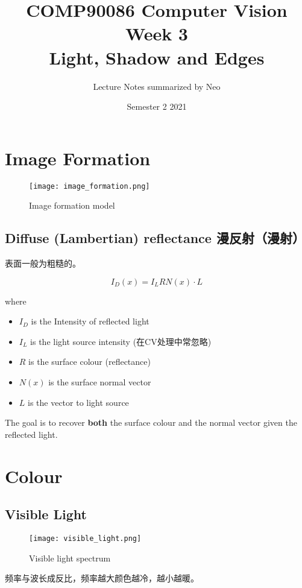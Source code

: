 \documentclass[11pt]{article}
\title{%
  \LARGE
  \textbf{COMP90086 Computer Vision \\
  \large Week 3
  \\
  Light, Shadow and Edges}}
\author{ Lecture Notes summarized by Neo }
\date{Semester 2 2021}
\begin{document}
\maketitle

\section{Image Formation}

\begin{figure}[hbt!]
    \centering
    \texttt{[image: image\_formation.png]}
    \caption{Image formation model}
\end{figure}
\subsection{Diffuse (Lambertian) reflectance 漫反射（漫射）}
表面一般为粗糙的。
\begin{Large}
    $$I_D(x)=I_LRN(x)\cdot L$$
\end{Large}
where
\begin{itemize}
    \item $I_D$ is the Intensity of reflected light
    \item $I_L$ is the light source intensity (在CV处理中常忽略)
    \item $R$ is the surface colour (reflectance)
    \item $N(x)$ is the surface normal vector
    \item $L$ is the vector to light source
\end{itemize}

\begin{framed}
    \begin{center}
        The goal is to recover \textbf{both} the surface colour and the normal vector given the reflected light.
    \end{center}
\end{framed}

\section{Colour}
\subsection{Visible Light}
\begin{figure}[hbt!]
    \centering
    \texttt{[image: visible\_light.png]}
    \caption{Visible light spectrum}
\end{figure}
频率与波长成反比，频率越大颜色越冷，越小越暖。
\end{document}
